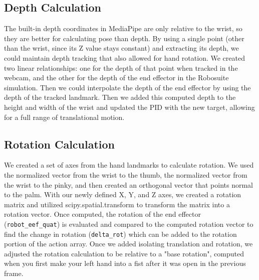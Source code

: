 \documentclass{article}
\begin{document}
\subsection{Depth Calculation}
The built-in depth coordinates in MediaPipe are only relative to the wrist, so
they are better for calculating pose than depth. By using a single point (other
than the wrist, since its Z value stays constant) and extracting its depth, we
could maintain depth tracking that also allowed for hand rotation. We created
two linear relationships: one for the depth of that point when tracked in the
webcam, and the other for the depth of the end effector in the Robosuite
simulation. Then we could interpolate the depth of the end effector by using
the depth of the tracked landmark. Then we added this computed depth to the
height and width of the wrist and updated the PID with the new target, allowing
for a full range of translational motion.

\subsection{Rotation Calculation}
We created a set of axes from the hand landmarks to calculate rotation. We used
the normalized vector from the wrist to the thumb, the normalized vector from
the wrist to the pinky, and then created an orthogonal vector that points
normal to the palm. With our newly defined X, Y, and Z axes, we created a
rotation matrix and utilized scipy.spatial.transform to transform the matrix
into a rotation vector. Once computed, the rotation of the end effector
(\texttt{robot\_eef\_quat}) is evaluated and compared to the computed rotation
vector to find the change in rotation (\texttt{delta\_rot}) which can be added
to the rotation portion of the action array. Once we added isolating
translation and rotation, we adjusted the rotation calculation to be relative
to a "base rotation", computed when you first make your left hand into a fist
after it was open in the previous frame. 
\end{document}
